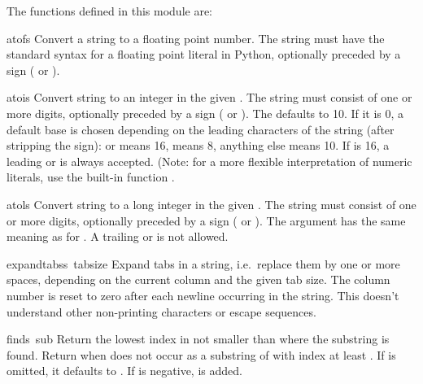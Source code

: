 The functions defined in this module are:

\renewcommand{\indexsubitem}{(in module string)}

\begin{funcdesc}{atof}{s}
Convert a string to a floating point number.  The string must have
the standard syntax for a floating point literal in Python, optionally
preceded by a sign (\samp{+} or \samp{-}).
\end{funcdesc}

\begin{funcdesc}{atoi}{s}
Convert string  to an integer in the given .  The
string must consist of one or more digits, optionally preceded by a
sign (\samp{+} or \samp{-}).  The  defaults to 10.  If it is
0, a default base is chosen depending on the leading characters of the
string (after stripping the sign):  or  means 16,
 means 8, anything else means 10.  If  is 16, a
leading  or  is always accepted.  (Note: for a more
flexible interpretation of numeric literals, use the built-in function
.
\end{funcdesc}

\begin{funcdesc}{atol}{s}
Convert string  to a long integer in the given .  The
string must consist of one or more digits, optionally preceded by a
sign (\samp{+} or \samp{-}).  The  argument has the same
meaning as for .  A trailing  or  is not
allowed.
\end{funcdesc}

\begin{funcdesc}{expandtabs}{s\, tabsize}
Expand tabs in a string, i.e.\ replace them by one or more spaces,
depending on the current column and the given tab size.  The column
number is reset to zero after each newline occurring in the string.
This doesn't understand other non-printing characters or escape
sequences.
\end{funcdesc}

\begin{funcdesc}{find}{s\, sub}
Return the lowest index in  not smaller than  where the
substring  is found.  Return  when 
does not occur as a substring of  with index at least .
If  is omitted, it defaults to .  If  is
negative,  is added.
\end{funcdesc}

